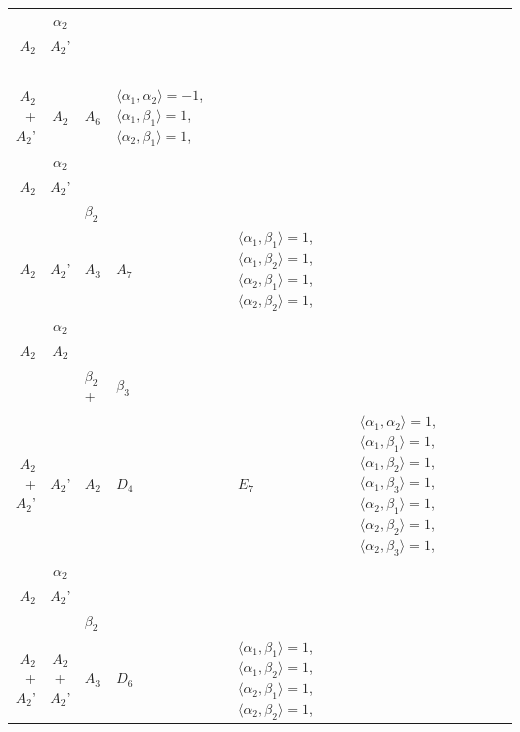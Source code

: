\documentclass[12pt]{report}
\begin{document}
\begin{appendix}
{\begin{longtable}{rcl p{1cm}p{1cm}p{3cm} }
\\
\begin{tabular}{cc}$\alpha_1$+ & $\alpha_2$\\\tiny{ $A_2$ } & \tiny{ $A_2$' }\end{tabular} &\begin{tabular}{c} = \\~ \end{tabular} & \begin{tabular}{c}$\beta_1$\\\tiny{ $A_2$+$A_2$' }\end{tabular} & $A_2$ & $A_6$ & $\langle\alpha_1, \alpha_2\rangle=-1$,  $\langle\alpha_1, \beta_1\rangle=1$, $\langle\alpha_2, \beta_1\rangle=1$, 
\\
\begin{tabular}{cc}$\alpha_1$+ & $\alpha_2$\\\tiny{ $A_2$ } & \tiny{ $A_2$' }\end{tabular} &\begin{tabular}{c} = \\~ \end{tabular} & \begin{tabular}{cc}$\beta_1$+ & $\beta_2$\\\tiny{ $A_2$ } & \tiny{ $A_2$' }\end{tabular} & $A_3$ & $A_7$ &  $\langle\alpha_1, \beta_1\rangle=1$, $\langle\alpha_1, \beta_2\rangle=1$, $\langle\alpha_2, \beta_1\rangle=1$, $\langle\alpha_2, \beta_2\rangle=1$, 
\\
\begin{tabular}{cc}$\alpha_1$+ & $\alpha_2$\\\tiny{ $A_2$ } & \tiny{ $A_2$ }\end{tabular} &\begin{tabular}{c} = \\~ \end{tabular} & \begin{tabular}{ccc}$\beta_1$+ & $\beta_2$+ & $\beta_3$\\\tiny{ $A_2$+$A_2$' } & \tiny{ $A_2$' } & \tiny{ $A_2$ }\end{tabular} & $D_4$ & $E_7$ & $\langle\alpha_1, \alpha_2\rangle=1$,  $\langle\alpha_1, \beta_1\rangle=1$, $\langle\alpha_1, \beta_2\rangle=1$, $\langle\alpha_1, \beta_3\rangle=1$, $\langle\alpha_2, \beta_1\rangle=1$, $\langle\alpha_2, \beta_2\rangle=1$, $\langle\alpha_2, \beta_3\rangle=1$, 
\\
\begin{tabular}{cc}$\alpha_1$+ & $\alpha_2$\\\tiny{ $A_2$ } & \tiny{ $A_2$' }\end{tabular} &\begin{tabular}{c} = \\~ \end{tabular} & \begin{tabular}{cc}$\beta_1$+ & $\beta_2$\\\tiny{ $A_2$+$A_2$' } & \tiny{ $A_2$+$A_2$' }\end{tabular} & $A_3$ & $D_6$ &  $\langle\alpha_1, \beta_1\rangle=1$, $\langle\alpha_1, \beta_2\rangle=1$, $\langle\alpha_2, \beta_1\rangle=1$, $\langle\alpha_2, \beta_2\rangle=1$, 

\end{longtable}}
\end{appendix}
\end{document}
